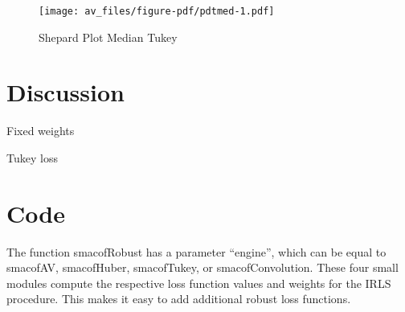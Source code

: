 \documentclass[
  12pt,
  letterpaper,
  DIV=11,
  numbers=noendperiod]{scrartcl}
\begin{document}
\begin{figure}[H]

{\centering \texttt{[image: av\_files/figure-pdf/pdtmed-1.pdf]}

}

\caption{Shepard Plot Median Tukey}

\end{figure}%

\section{Discussion}\label{discussion}

Fixed weights

Tukey loss

\section{Code}\label{code}

The function smacofRobust has a parameter ``engine'', which can be equal
to smacofAV, smacofHuber, smacofTukey, or smacofConvolution. These four
small modules compute the respective loss function values and weights
for the IRLS procedure. This makes it easy to add additional robust loss
functions.
\end{document}
